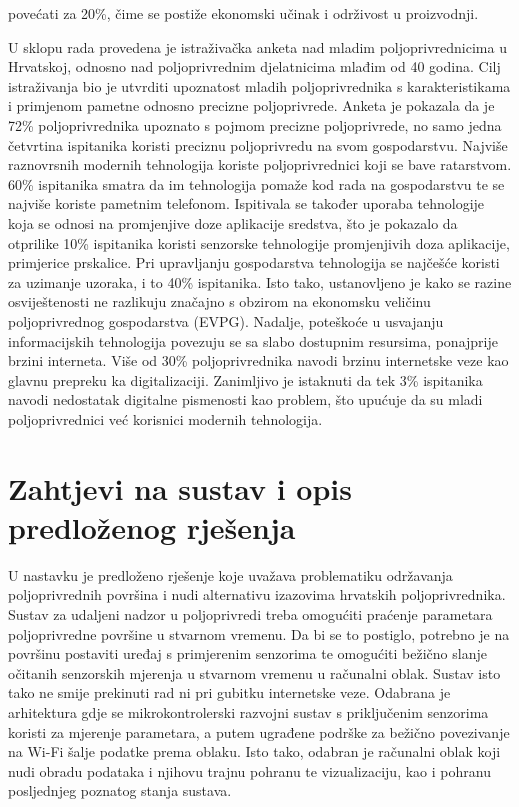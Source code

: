 povećati za 20\%, čime se postiže ekonomski učinak i održivost u proizvodnji.

U sklopu rada \cite{arapovic} provedena je istraživačka anketa nad mladim poljoprivrednicima u Hrvatskoj, odnosno nad poljoprivrednim djelatnicima mlađim od 40 godina. Cilj istraživanja bio je utvrditi upoznatost mladih poljoprivrednika s karakteristikama i primjenom pametne odnosno precizne poljoprivrede. Anketa je pokazala da je 72\% poljoprivrednika upoznato s pojmom precizne poljoprivrede, no samo jedna četvrtina ispitanika koristi preciznu poljoprivredu na svom gospodarstvu. Najviše raznovrsnih modernih tehnologija koriste poljoprivrednici koji se bave ratarstvom. 60\% ispitanika smatra da im tehnologija pomaže kod rada na gospodarstvu te se najviše koriste pametnim telefonom. Ispitivala se također uporaba tehnologije koja se odnosi na promjenjive doze aplikacije sredstva, što je pokazalo da otprilike 10\% ispitanika koristi senzorske tehnologije promjenjivih doza aplikacije, primjerice prskalice. Pri upravljanju gospodarstva tehnologija se najčešće koristi za uzimanje uzoraka, i to 40\% ispitanika. Isto tako, ustanovljeno je kako se razine osviještenosti ne razlikuju značajno s obzirom na ekonomsku veličinu poljoprivrednog gospodarstva (EVPG). Nadalje, poteškoće u usvajanju informacijskih tehnologija povezuju se sa slabo dostupnim resursima, ponajprije brzini interneta. Više od 30\% poljoprivrednika navodi brzinu internetske veze kao glavnu prepreku ka digitalizaciji. Zanimljivo je istaknuti da tek 3\% ispitanika navodi nedostatak digitalne pismenosti kao problem, što upućuje da su mladi poljoprivrednici već korisnici modernih tehnologija. 

\section{Zahtjevi na sustav i opis predloženog rješenja}

U nastavku je predloženo rješenje koje uvažava problematiku održavanja poljoprivrednih površina i nudi alternativu izazovima hrvatskih poljoprivrednika. Sustav za udaljeni nadzor u poljoprivredi treba omogućiti praćenje parametara poljoprivredne površine u stvarnom vremenu. Da bi se to postiglo, potrebno je na površinu postaviti uređaj s primjerenim senzorima te omogućiti bežično slanje očitanih senzorskih mjerenja u stvarnom vremenu u računalni oblak. Sustav isto tako ne smije prekinuti rad ni pri gubitku internetske veze. Odabrana je arhitektura gdje se mikrokontrolerski razvojni sustav s priključenim senzorima koristi za mjerenje parametara, a putem ugrađene podrške za bežično povezivanje na Wi-Fi šalje podatke prema oblaku. Isto tako, odabran je računalni oblak koji nudi obradu podataka i njihovu trajnu pohranu te vizualizaciju, kao i pohranu posljednjeg poznatog stanja sustava.

